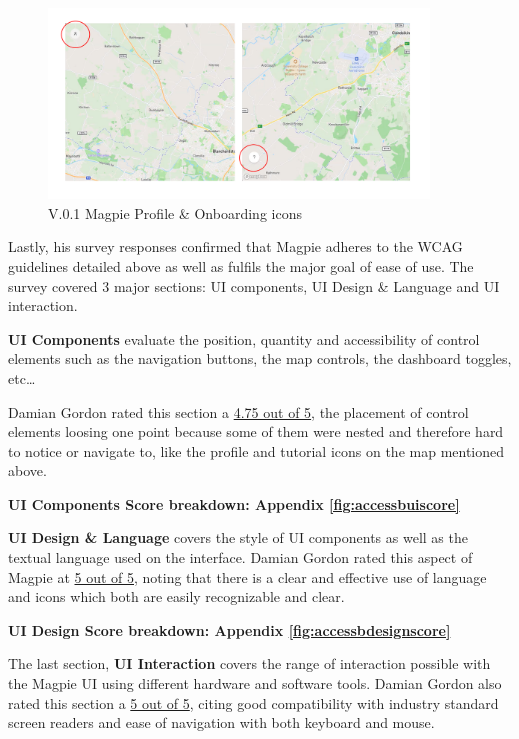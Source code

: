 \begin{figure}[h!]
    \centering
    \includegraphics[width=0.9\textwidth]{images/old-icons-map.png}
    \caption{V.0.1 Magpie Profile \& Onboarding icons}
\end{figure}

\newpage{}

Lastly, his survey responses confirmed that Magpie adheres to the WCAG
guidelines detailed above as well as fulfils the major goal of ease of use. The
survey covered 3 major sections: UI components, UI Design \& Language and UI
interaction.

\textbf{UI Components} evaluate the position, quantity and
accessibility of control elements such as the navigation buttons, the map
controls, the dashboard toggles, etc\ldots

Damian Gordon rated this section a \underline{4.75 out of 5}, the placement of
control elements loosing one point because some of them were nested and
therefore hard to notice or navigate to, like the profile and tutorial icons on
the map mentioned above.

\hspace{2em}\textbf{UI Components Score breakdown: Appendix \ref{fig:accessbuiscore}}

\textbf{UI Design \& Language} covers the style of UI components as
well as the textual language used on the interface.
Damian Gordon rated this aspect of Magpie at \underline{5 out of 5}, noting that
there is a clear and effective use of language and icons which both are easily
recognizable and clear.

\hspace{2em}\textbf{UI Design Score breakdown: Appendix
    \ref{fig:accessbdesignscore}}

The last section, \textbf{UI Interaction} covers the range of
interaction possible with the Magpie UI using different hardware and software
tools. Damian Gordon also rated this section a \underline{5 out of 5}, citing
good compatibility with industry standard screen readers and ease of navigation
with both keyboard and mouse.

